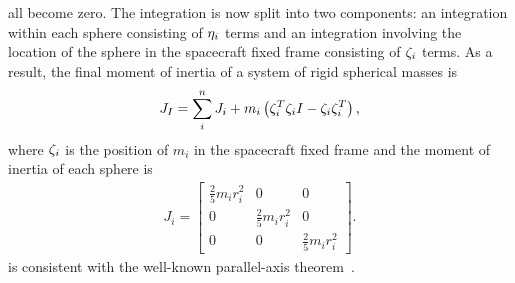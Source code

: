 all become zero.
The integration is now split into two components: an integration within each sphere consisting of \( \eta_i \) terms and an integration involving the location of the sphere in the spacecraft fixed frame consisting of \( \zeta_i \) terms.
As a result, the final moment of inertia of a system of rigid spherical masses is 
\begin{align}\label{eq:dumbbell_moment_of_inertia}
    J_I = \sum_i^n J_i + m_i \left( \zeta_i^T \zeta_i I - \zeta_i \zeta_i^T \right) , 
\end{align}
where \( \zeta_i \) is the position of \( m_i \) in the spacecraft fixed frame and the moment of inertia of each sphere is
\begin{align}\label{eq:sphere_moment_of_inertia}
    J_i = \begin{bmatrix} 
        \frac{2}{5} m_i r_i^2 & 0 & 0 \\
        0 & \frac{2}{5} m_i r_i^2 & 0 \\
        0 & 0 & \frac{2}{5} m_i r_i^2 
    \end{bmatrix}.
\end{align}
 is consistent with the well-known parallel-axis theorem~\cite{greenwood1988}.


